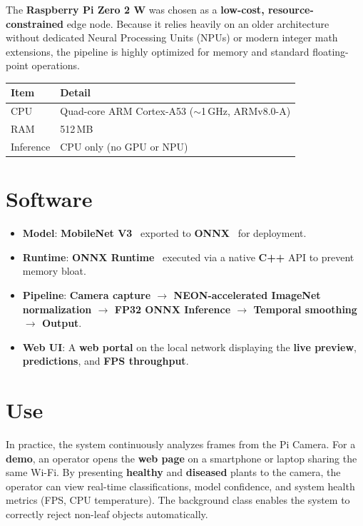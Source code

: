 \documentclass[a4paper,onesided,12pt]{report}
\begin{document}
The \textbf{Raspberry Pi Zero 2 W} was chosen as a \textbf{low-cost, resource-constrained} edge node. Because it relies heavily on an older architecture without dedicated Neural Processing Units (NPUs) or modern integer math extensions, the pipeline is highly optimized for memory and standard floating-point operations.

\begin{table}[htbp]
\centering
\begin{tabular}{|l|p{}|}
\hline
\textbf{Item} & \textbf{Detail} \\
\hline
CPU & Quad-core ARM Cortex-A53 ($\sim$1\,GHz, ARMv8.0-A) \\
\hline
RAM & 512\,MB \\
\hline
Inference & CPU only (no GPU or NPU) \\
\hline
\end{tabular}
\end{table}

\section{Software}

\begin{itemize}
\item \textbf{Model}: \textbf{MobileNet V3}~\cite{howard2019mobilenetv3} exported to \textbf{ONNX}~\cite{onnx} for deployment.
\item \textbf{Runtime}: \textbf{ONNX Runtime}~\cite{onnxruntime} executed via a native \textbf{C++} API to prevent memory bloat.
\item \textbf{Pipeline}: \textbf{Camera capture $\rightarrow$ NEON-accelerated ImageNet normalization $\rightarrow$ FP32 ONNX Inference $\rightarrow$ Temporal smoothing $\rightarrow$ Output}.
\item \textbf{Web UI}: A \textbf{web portal} on the local network displaying the \textbf{live preview}, \textbf{predictions}, and \textbf{FPS throughput}.
\end{itemize}

\section{Use}

In practice, the system continuously analyzes frames from the Pi Camera. For a \textbf{demo}, an operator opens the \textbf{web page} on a smartphone or laptop sharing the same Wi-Fi. By presenting \textbf{healthy} and \textbf{diseased} plants to the camera, the operator can view real-time classifications, model confidence, and system health metrics (FPS, CPU temperature). The background class enables the system to correctly reject non-leaf objects automatically.
\end{document}
